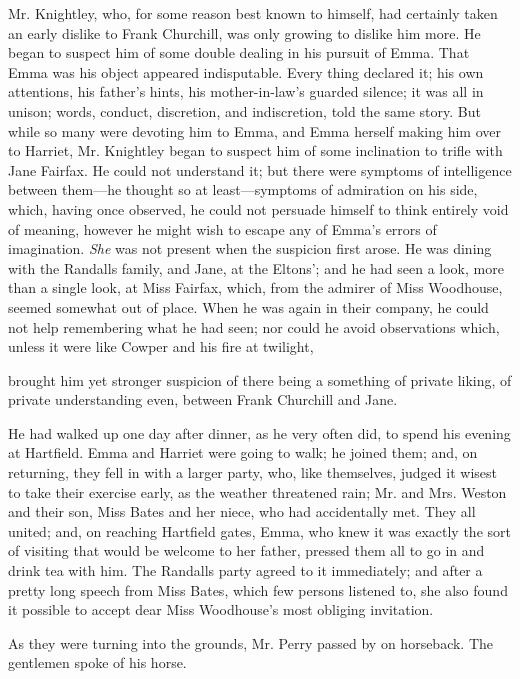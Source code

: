 Mr. Knightley, who, for some reason best known to himself, had certainly taken an early dislike to Frank Churchill, was only growing to dislike him more. He began to suspect him of some double dealing in his pursuit of Emma. That Emma was his object appeared indisputable. Every thing declared it; his own attentions, his father's hints, his mother-in-law's guarded silence; it was all in unison; words, conduct, discretion, and indiscretion, told the same story. But while so many were devoting him to Emma, and Emma herself making him over to Harriet, Mr. Knightley began to suspect him of some inclination to trifle with Jane Fairfax. He could not understand it; but there were symptoms of intelligence between them---he thought so at least---symptoms of admiration on his side, which, having once observed, he could not persuade himself to think entirely void of meaning, however he might wish to escape any of Emma's errors of imagination. {\em She} was not present when the suspicion first arose. He was dining with the Randalls family, and Jane, at the Eltons'; and he had seen a look, more than a single look, at Miss Fairfax, which, from the admirer of Miss Woodhouse, seemed somewhat out of place. When he was again in their company, he could not help remembering what he had seen; nor could he avoid observations which, unless it were like Cowper and his fire at twilight,


brought him yet stronger suspicion of there being a something of private liking, of private understanding even, between Frank Churchill and Jane.

He had walked up one day after dinner, as he very often did, to spend his evening at Hartfield. Emma and Harriet were going to walk; he joined them; and, on returning, they fell in with a larger party, who, like themselves, judged it wisest to take their exercise early, as the weather threatened rain; Mr. and Mrs. Weston and their son, Miss Bates and her niece, who had accidentally met. They all united; and, on reaching Hartfield gates, Emma, who knew it was exactly the sort of visiting that would be welcome to her father, pressed them all to go in and drink tea with him. The Randalls party agreed to it immediately; and after a pretty long speech from Miss Bates, which few persons listened to, she also found it possible to accept dear Miss Woodhouse's most obliging invitation.

As they were turning into the grounds, Mr. Perry passed by on horseback. The gentlemen spoke of his horse.

